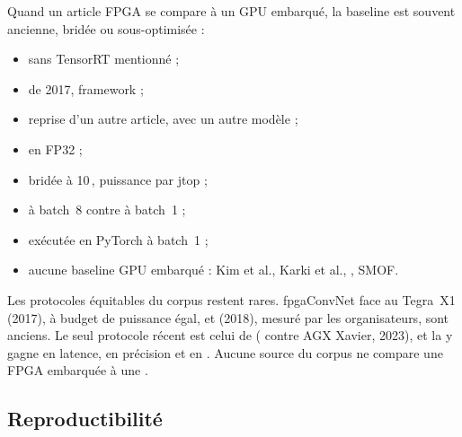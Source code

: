 Quand un article FPGA se compare à un GPU embarqué, la baseline est souvent ancienne,
bridée ou sous-optimisée :
\begin{itemize}
  \item {} sans TensorRT mentionné
    \citep[Table~2]{2019-ding-req-yolo-resource-aware-efficient} ;
  \item {} de 2017, framework \nr{}
    \citep[Table~IV]{2023-montgomerie-corcoran-satay-streaming-architecture-toolflow-accelerating} ;
  \item {} reprise d'un autre article, avec un autre modèle
    \citep[Table~7]{2023-zhai-fpga-vehicle-detection-tracking-accelerator} ;
  \item {} en FP32
    \citep[§5.3]{2024-zhang-end-end-acceleration-yolo-object} ;
  \item {} bridée à 10\,, puissance par jtop
    \citep[§IV, Table~VI]{arxiv-2407.17647-energy-efficient-artefact-detection-accelerator} ;
  \item {} à batch~8 contre  à batch~1
    \citep[Table~VI]{2024-aggarwal-chameleon-dual-memory-replay-online} ;
  \item {} exécutée en PyTorch à batch~1
    \citep[§VII-C]{arxiv-2604.21280-imagehd-energy-efficient-device-continual} ;
  \item aucune baseline GPU embarqué : Kim et al., Karki et al.\pp, \pp, SMOF\pp.
\end{itemize}
Les protocoles équitables du corpus restent rares. fpgaConvNet face au Tegra~X1 (2017), à
budget de puissance égal, et  (2018), mesuré par les organisateurs, sont anciens.
Le seul protocole récent est celui de
\citet{arxiv-2304.11580-framework-benchmarking-real-time-embedded} ( contre AGX
Xavier, 2023), et la  y gagne en latence, en précision et en  .
Aucune source du corpus ne compare une FPGA embarquée à une .

\subsection{Reproductibilité}

